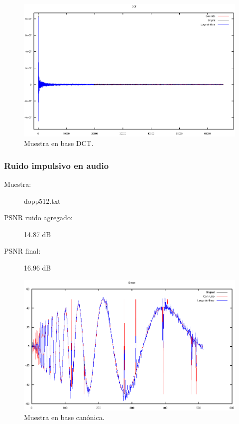 \documentclass[a4paper,10pt,twoside]{article}
\begin{document}
\begin{figure}[H]
  \centering
  \includegraphics[width=15cm]{graficos/lena_aditivo_umbralizar_dct.png} 
  \caption{Muestra en base DCT.}
\end{figure}


\subsubsection{Ruido impulsivo en audio}

\begin{description}
  \item[Muestra:] dopp512.txt
  \item[PSNR ruido agregado:] 14.87 dB
  \item[PSNR final:] 16.96 dB
\end{description}

\begin{figure}[H]
  \centering
  \includegraphics[width=15cm]{graficos/dopp_impulsivo_umbralizar_muestra.png}
  \caption{Muestra en base canónica.}
\end{figure}
\end{document}
